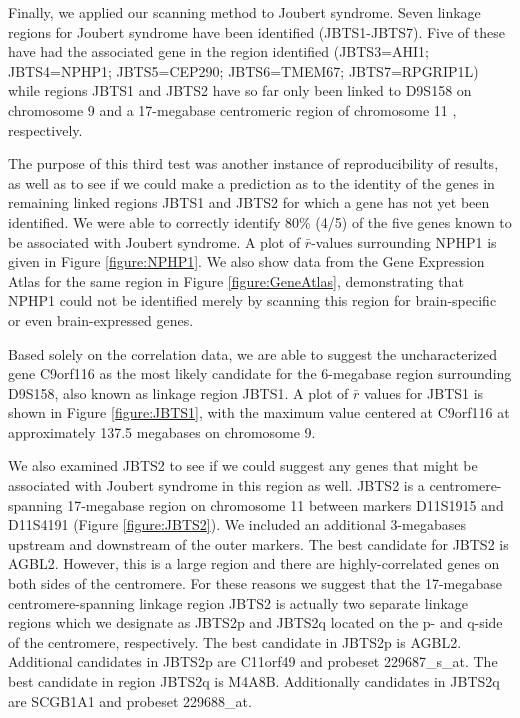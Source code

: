 \documentclass{bioinfo}
\begin{document}
Finally, we applied our scanning method to Joubert syndrome.  Seven linkage
regions for Joubert syndrome have been identified (JBTS1-JBTS7).  Five of
these have had the associated gene in the region identified (JBTS3=AHI1;
JBTS4=NPHP1; JBTS5=CEP290; JBTS6=TMEM67; JBTS7=RPGRIP1L)
\cite{JBTS3,JBTS4,JBTS5,JBTS6,JBTS7} while regions JBTS1 and JBTS2 have so far
only been linked to D9S158 \cite{JBTS1} on chromosome 9 and a 17-megabase
centromeric region of chromosome 11 \cite{JBTS2A,JBTS2B,JBTS2C}, respectively.

The purpose of this third test was another instance of reproducibility of
results, as well as to see if we could make a prediction as to the identity of
the genes in remaining linked regions JBTS1 and JBTS2 for which a gene has not
yet been identified.  We were able to correctly identify 80\% (4/5) of the five
genes known to be associated with Joubert syndrome.  A plot of $\bar{r}$-values
surrounding NPHP1 is given in Figure \ref{figure:NPHP1}.  We also show data
from the Gene Expression Atlas \cite{GNF} for the same region in Figure
\ref{figure:GeneAtlas}, demonstrating that NPHP1 could not be identified merely
by scanning this region for brain-specific or even brain-expressed genes.

Based solely on the correlation data, we are able to suggest the
uncharacterized gene C9orf116 as the most likely candidate for the 6-megabase
region surrounding D9S158, also known as linkage region JBTS1.  A plot of
$\bar{r}$ values for JBTS1 is shown in Figure \ref{figure:JBTS1}, with the
maximum value centered at C9orf116 at approximately 137.5 megabases on
chromosome 9.

We also examined JBTS2 to see if we could suggest any genes that might be
associated with Joubert syndrome in this region as well.  JBTS2 is a
centromere-spanning 17-megabase region on chromosome 11 between markers
D11S1915 and D11S4191 (Figure \ref{figure:JBTS2}).  We included an additional
3-megabases upstream and downstream of the outer markers.  The best candidate
for JBTS2 is AGBL2.  However, this is a large region and there are
highly-correlated genes on both sides of the centromere.  For these reasons we
suggest that the 17-megabase centromere-spanning linkage region JBTS2 is
actually two separate linkage regions which we designate as JBTS2p and JBTS2q
located on the p- and q-side of the centromere, respectively.  The best
candidate in JBTS2p is AGBL2.  Additional candidates in JBTS2p are C11orf49 and
probeset 229687\_s\_at.  The best candidate in region JBTS2q is M4A8B.
Additionally candidates in JBTS2q are SCGB1A1 and probeset 229688\_at.
\end{document}
